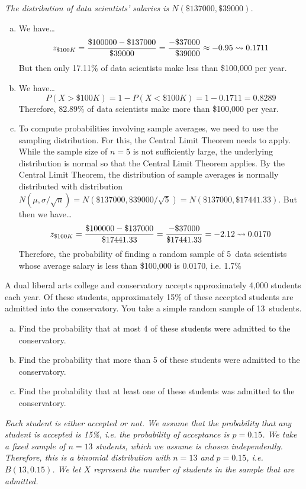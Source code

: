 \documentclass[12pt,letterpaper]{exam}
\begin{document}
\begin{questions}
{\itshape
\sol The distribution of data scientists' salaries is $N(\$137000, \$39000)$. 
\begin{enumerate}[(a)]
\item We have\dots
	\[
	z_{\$100K}= \dfrac{\$100000 - \$137000}{\$39000}= \dfrac{-\$37000}{\phantom{-}\$39000} \approx -0.95 \rightsquigarrow 0.1711
	\]
But then only 17.11\% of data scientists make less than \$100,000 per year. \pspace

\item We have\dots
	\[
	P(X > \$100K)= 1 - P(X < \$100K)= 1 - 0.1711= 0.8289
	\]
Therefore, 82.89\% of data scientists make more than \$100,000 per year. \pspace

\item To compute probabilities involving sample averages, we need to use the sampling distribution. For this, the Central Limit Theorem needs to apply. While the sample size of $n= 5$ is not sufficiently large, the underlying distribution is normal so that the Central Limit Theorem applies. By the Central Limit Theorem, the distribution of sample averages is normally distributed with distribution $N(\mu, \sigma/\sqrt{n})= N(\$137000, \$39000/\sqrt{5})= N(\$137000, \$17441.33)$. But then we have\dots
	\[
	z_{\$100K}= \dfrac{\$100000 - \$137000}{\$17441.33}= \dfrac{-\$37000}{\$17441.33}= -2.12 \rightsquigarrow 0.0170
	\]
Therefore, the probability of finding a random sample of 5~data scientists whose average salary is less than \$100,000 is 0.0170, i.e. 1.7\%
\end{enumerate}
}



\newpage
\question[10] A dual liberal arts college and conservatory accepts approximately 4,000 students each year. Of these students, approximately 15\% of these accepted students are admitted into the conservatory. You take a simple random sample of 13~students.
	\begin{enumerate}[(a)]
	\item Find the probability that at most 4 of these students were admitted to the conservatory. 
	\item Find the probability that more than 5 of these students were admitted to the conservatory. 
	\item Find the probability that at least one of these students was admitted to the conservatory. 
	\end{enumerate} 

{\itshape 
\sol Each student is either accepted or not. We assume that the probability that any student is accepted is 15\%, i.e. the probability of acceptance is $p= 0.15$. We take a fixed sample of $n= 13$ students, which we assume is chosen independently. Therefore, this is a binomial distribution with $n= 13$ and $p= 0.15$, i.e. $B(13, 0.15)$. We let $X$ represent the number of students in the sample that are admitted. 

}
\end{questions}
\end{document}
